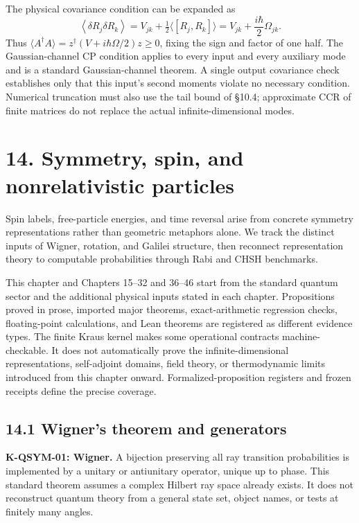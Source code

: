 \documentclass[
  11pt,
  oneside]{book}
\begin{document}
The physical covariance condition can be expanded as \[
\left\langle\delta R_j\delta R_k\right\rangle
=V_{jk}+\tfrac12\langle[R_j,R_k]\rangle
=V_{jk}+\frac{i\hbar}{2}\Omega_{jk}.
\] Thus \(\langle A^\dagger A\rangle=z^\dagger(V+i\hbar\Omega/2)z\ge0\),
fixing the sign and factor of one half. The Gaussian-channel CP
condition applies to every input and every auxiliary mode and is a
standard Gaussian-channel theorem. A single output covariance check
establishes only that this input's second moments violate no necessary
condition. Numerical truncation must also use the tail bound of §10.4;
approximate CCR of finite matrices do not replace the actual
infinite-dimensional modes.

\chapter{14. Symmetry, spin, and nonrelativistic particles}\label{ch-14}

Spin labels, free-particle energies, and time reversal arise from
concrete symmetry representations rather than geometric metaphors alone.
We track the distinct inputs of Wigner, rotation, and Galilei structure,
then reconnect representation theory to computable probabilities through
Rabi and CHSH benchmarks.

This chapter and Chapters 15--32 and 36--46 start from the standard
quantum sector and the additional physical inputs stated in each
chapter. Propositions proved in prose, imported major theorems,
exact-arithmetic regression checks, floating-point calculations, and
Lean theorems are registered as different evidence types. The finite
Kraus kernel makes some operational contracts machine-checkable. It does
not automatically prove the infinite-dimensional representations,
self-adjoint domains, field theory, or thermodynamic limits introduced
from this chapter onward. Formalized-proposition registers and frozen
receipts define the precise coverage.

\section{14.1 Wigner's theorem and generators}

\textbf{K-QSYM-01: Wigner.} A bijection preserving all ray transition
probabilities is implemented by a unitary or antiunitary operator,
unique up to phase. This standard theorem assumes a complex Hilbert ray
space already exists. It does not reconstruct quantum theory from a
general state set, object names, or tests at finitely many angles.
\end{document}
